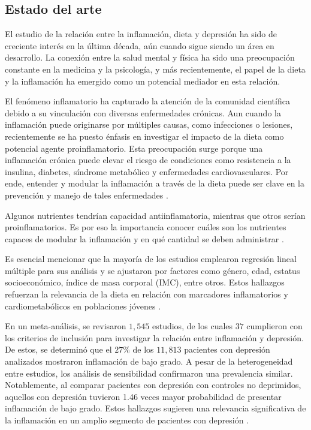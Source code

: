 \documentclass[jou]{apa7}
\begin{document}
	\subsection{Estado del arte}

	El estudio de la relación entre la inflamación, dieta y depresión ha
	sido de creciente interés en la última década, aún cuando sigue siendo un área en
	desarrollo. La conexión entre la salud mental y física ha sido una
	preocupación constante en la medicina y la psicología, y más
	recientemente, el papel de la dieta y la inflamación ha emergido como un
	potencial mediador en esta relación.

	El fenómeno inflamatorio ha capturado la atención de la comunidad
	científica debido a su vinculación con diversas enfermedades crónicas.
	Aun cuando la inflamación puede originarse por múltiples causas, como
	infecciones o lesiones, recientemente se ha puesto énfasis en investigar
	el impacto de la dieta como potencial agente proinflamatorio. Esta
	preocupación surge porque una inflamación crónica puede elevar el riesgo
	de condiciones como resistencia a la insulina, diabetes, síndrome
	metabólico y enfermedades cardiovasculares. Por ende, entender y modular
	la inflamación a través de la dieta puede ser clave en la prevención y
	manejo de tales enfermedades \parencites{daneshLowGradeInflammation2000}{ridkerHighsensitivityCreactiveProtein2004}{salas-salvadoConjugatedLinoleicAcid2006}.

	Algunos nutrientes tendrían capacidad antiinflamatoria, mientras que
	otros serían proinflamatorios. Es por eso la importancia conocer cuáles
	son los nutrientes capaces de modular la inflamación y en qué cantidad
	se deben administrar \parencite{giuglianoMetabolicCardiovascularEffects1997}.

	Es esencial mencionar que la mayoría de los estudios emplearon regresión
	lineal múltiple para sus análisis y se ajustaron por factores como
	género, edad, estatus socioeconómico, índice de masa corporal (IMC),
	entre otros. Estos hallazgos refuerzan la relevancia de la dieta en
	relación con marcadores inflamatorios y cardiometabólicos en poblaciones
	jóvenes \parencite{cotaCardiometabolicRiskHealth2021}.

	En un meta-análisis, se revisaron $1,545$ estudios, de los cuales $37$
	cumplieron con los criterios de inclusión para investigar la relación
	entre inflamación y depresión. De estos, se determinó que el $27\%$ de los
	$11,813$ pacientes con depresión analizados mostraron inflamación de bajo
	grado. A pesar de la heterogeneidad entre estudios, los análisis de
	sensibilidad confirmaron una prevalencia similar. Notablemente, al
	comparar pacientes con depresión con controles no deprimidos, aquellos
	con depresión tuvieron 1.46 veces mayor probabilidad de presentar
	inflamación de bajo grado. Estos hallazgos sugieren una relevancia
	significativa de la inflamación en un amplio segmento de pacientes con
	depresión \parencite{Osimo2019}.
\end{document}
